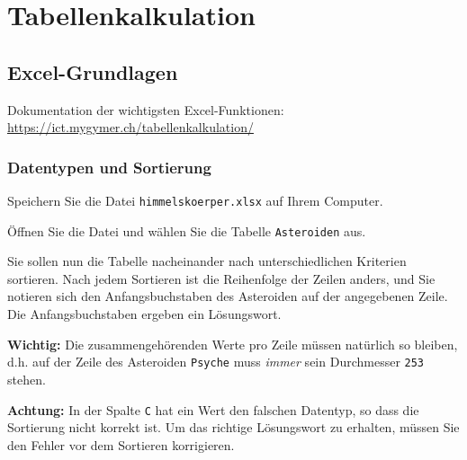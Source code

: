 \chapter{Tabellenkalkulation}\label{ch:Lektion}
\section{Excel-Grundlagen}
\begin{mycaution}
    Dokumentation der wichtigsten Excel-Funktionen: \url{https://ict.mygymer.ch/tabellenkalkulation/}
\end{mycaution}
\subsection{Datentypen und Sortierung}

\begin{myexercise}
    Speichern Sie die Datei \texttt{himmelskoerper.xlsx} auf Ihrem Computer.

    Öffnen Sie die Datei und wählen Sie die Tabelle \texttt{Asteroiden} aus.

    Sie sollen nun die Tabelle nacheinander nach unterschiedlichen Kriterien sortieren. Nach jedem Sortieren ist die Reihenfolge der Zeilen anders, und Sie notieren sich den Anfangsbuchstaben des Asteroiden auf der angegebenen Zeile. Die Anfangsbuchstaben ergeben ein Lösungswort.

    \textbf{Wichtig:} Die zusammengehörenden Werte pro Zeile müssen natürlich so bleiben, d.h. auf der Zeile des Asteroiden \texttt{Psyche} muss \textit{immer} sein Durchmesser \texttt{253} stehen.

    \textbf{Achtung:} In der Spalte \texttt{C} hat ein Wert den falschen Datentyp, so dass die Sortierung nicht korrekt ist. Um das richtige Lösungswort zu erhalten, müssen Sie den Fehler vor dem Sortieren korrigieren.


\end{myexercise}
